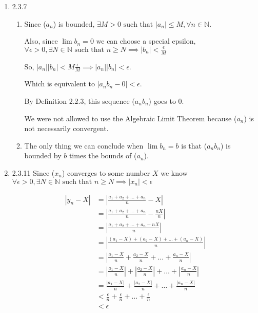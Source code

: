 \documentclass[12pt,letterpaper]{article}
\begin{document}
\begin{enumerate}
    \item 2.3.7
      \begin{enumerate}
        \item
          Since ($a_n$) is bounded,
          $\exists M > 0 \text{ such that } |a_n| \le M, \forall n \in \mathbb{N}$.

          Also, since $\lim b_n = 0$ we can choose a special epsilon,
          $
            \forall \epsilon > 0, \exists N \in \mathbb{N} \text{ such that }
            n \ge N \implies |b_n| < \frac{\epsilon}{M}
          $

          So, $|a_n||b_n| < M\frac{\epsilon}{M} \implies |a_n||b_n| < \epsilon$.

          Which is equivalent to $|a_n b_n - 0| < \epsilon$.

          By Definition 2.2.3, this sequence ($a_n b_n$) goes to $0$.

          We were not allowed to use the Algebraic Limit Theorem
          because ($a_n$) is not necessarily convergent.

        \item
          The only thing we can conclude when $\lim b_n = b$
          is that ($a_n b_n$) is bounded by $b$ times the bounds of ($a_n$).
      \end{enumerate}

    \item 2.3.11
      Since ($x_n$) converges to some number $X$ we know
      $
        \forall \epsilon > 0, \exists N \in \mathbb{N} \text{ such that }
        n \ge N \implies |x_n| < \epsilon
      $

      \begin{align*}
        \left|y_n - X\right| &= \left|\frac{a_1 + a_2 + \dots + a_n}{n} - X\right| \\
        &= \left|\frac{a_1 + a_2 + \dots + a_n}{n} - \frac{nX}{n}\right| \\
        &= \left|\frac{a_1 + a_2 + \dots + a_n - nX}{n}\right| \\
        &= \left|\frac{(a_1 - X) + (a_2 - X) + \dots + (a_n - X)}{n}\right| \\
        &= \left|\frac{a_1 - X}{n} + \frac{a_2 - X}{n} + \dots + \frac{a_n - X}{n}\right| \\
        &= \left|\frac{a_1 - X}{n}\right| + \left|\frac{a_2 - X}{n}\right| + \dots + \left|\frac{a_n - X}{n}\right| \\
        &= \frac{\left|a_1 - X\right|}{n} + \frac{\left|a_2 - X\right|}{n} + \dots + \frac{\left|a_n - X\right|}{n} \\
        &< \frac{\epsilon}{n} + \frac{\epsilon}{n} + \dots + \frac{\epsilon}{n} \\
        &< \epsilon \\
      \end{align*}


\end{enumerate}
\end{document}
